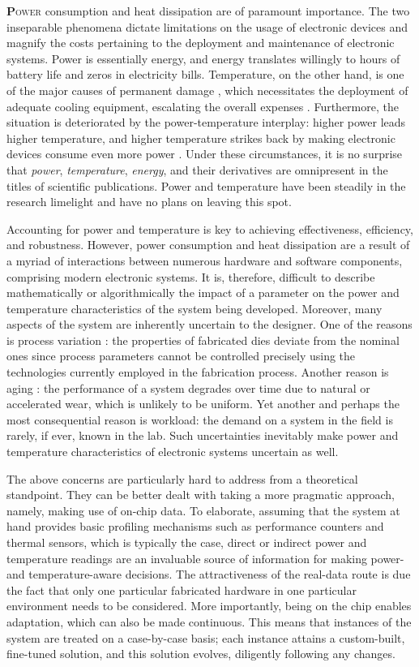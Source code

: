 \lettrine[findent=0.4em, nindent=0em]{\textbf{P}}{ower} consumption and heat
dissipation are of paramount importance. The two inseparable phenomena dictate
limitations on the usage of electronic devices and magnify the costs pertaining
to the deployment and maintenance of electronic systems. Power is essentially
energy, and energy translates willingly to hours of battery life and zeros in
electricity bills. Temperature, on the other hand, is one of the major causes of
permanent damage \cite{jedec}, which necessitates the deployment of adequate
cooling equipment, escalating the overall expenses \cite{chaudhry2015}.
Furthermore, the situation is deteriorated by the power-temperature interplay:
higher power leads higher temperature, and higher temperature strikes back by
making electronic devices consume even more power \cite{liu2007}. Under these
circumstances, it is no surprise that \emph{power}, \emph{temperature},
\emph{energy}, and their derivatives are omnipresent in the titles of scientific
publications. Power and temperature have been steadily in the research limelight
and have no plans on leaving this spot.

Accounting for power and temperature is key to achieving effectiveness,
efficiency, and robustness. However, power consumption and heat dissipation are
a result of a myriad of interactions between numerous hardware and software
components, comprising modern electronic systems. It is, therefore, difficult to
describe mathematically or algorithmically the impact of a parameter on the
power and temperature characteristics of the system being developed. Moreover,
many aspects of the system are inherently uncertain to the designer. One of the
reasons is process variation \cite{chandrakasan2000}: the properties of
fabricated dies deviate from the nominal ones since process parameters cannot be
controlled precisely using the technologies currently employed in the
fabrication process. Another reason is aging \cite{coskun2006}: the performance
of a system degrades over time due to natural or accelerated wear, which is
unlikely to be uniform. Yet another and perhaps the most consequential reason is
workload: the demand on a system in the field is rarely, if ever, known in the
lab. Such uncertainties inevitably make power and temperature characteristics of
electronic systems uncertain as well.

The above concerns are particularly hard to address from a theoretical
standpoint. They can be better dealt with taking a more pragmatic approach,
namely, making use of on-chip data. To elaborate, assuming that the system at
hand provides basic profiling mechanisms such as performance counters and
thermal sensors, which is typically the case, direct or indirect power and
temperature readings are an invaluable source of information for making power-
and temperature-aware decisions. The attractiveness of the real-data route is
due the fact that only one particular fabricated hardware in one particular
environment needs to be considered. More importantly, being on the chip enables
adaptation, which can also be made continuous. This means that instances of the
system are treated on a case-by-case basis; each instance attains a
custom-built, fine-tuned solution, and this solution evolves, diligently
following any changes.

